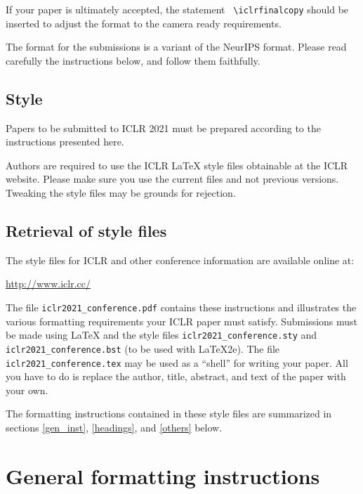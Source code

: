 \documentclass{article}
\begin{document}
If your paper is ultimately accepted, the statement {\tt
  {\textbackslash}iclrfinalcopy} should be inserted to adjust the
format to the camera ready requirements.

The format for the submissions is a variant of the NeurIPS format.
Please read carefully the instructions below, and follow them
faithfully.

\subsection*{Style}

Papers to be submitted to ICLR 2021 must be prepared according to the
instructions presented here.


Authors are required to use the ICLR \LaTeX{} style files obtainable at the
ICLR website. Please make sure you use the current files and
not previous versions. Tweaking the style files may be grounds for rejection.

\subsection*{Retrieval of style files}

The style files for ICLR and other conference information are available online at:
\begin{center}
   \url{http://www.iclr.cc/}
\end{center}
The file \verb+iclr2021_conference.pdf+ contains these
instructions and illustrates the
various formatting requirements your ICLR paper must satisfy.
Submissions must be made using \LaTeX{} and the style files
\verb+iclr2021_conference.sty+ and \verb+iclr2021_conference.bst+ (to be used with \LaTeX{}2e). The file
\verb+iclr2021_conference.tex+ may be used as a ``shell'' for writing your paper. All you
have to do is replace the author, title, abstract, and text of the paper with
your own.

The formatting instructions contained in these style files are summarized in
sections \ref{gen_inst}, \ref{headings}, and \ref{others} below.

\section*{General formatting instructions}
\label{gen_inst}
\end{document}
